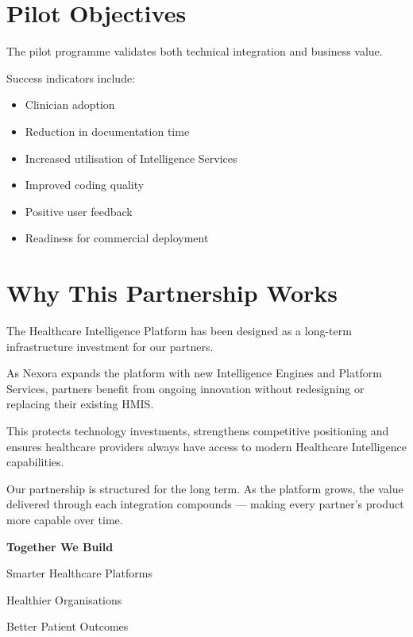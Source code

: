 
\section{Pilot Objectives}

The pilot programme validates both technical integration and business value.

Success indicators include:

\begin{itemize}

\item Clinician adoption

\item Reduction in documentation time

\item Increased utilisation of Intelligence Services

\item Improved coding quality

\item Positive user feedback

\item Readiness for commercial deployment

\end{itemize}


\section{Why This Partnership Works}

The Healthcare Intelligence Platform has been designed as a long-term infrastructure investment for our partners.

As Nexora expands the platform with new Intelligence Engines and Platform Services, partners benefit from ongoing innovation without redesigning or replacing their existing HMIS.

This protects technology investments, strengthens competitive positioning and ensures healthcare providers always have access to modern Healthcare Intelligence capabilities.

Our partnership is structured for the long term. As the platform grows, the value delivered through each integration compounds — making every partner's product more capable over time.

\vspace{7mm}

\begin{callout}

\centering

\Huge

\textbf{Together We Build}

\vspace{4mm}

Smarter Healthcare Platforms

\vspace{3mm}

Healthier Organisations

\vspace{3mm}

Better Patient Outcomes

\end{callout}
